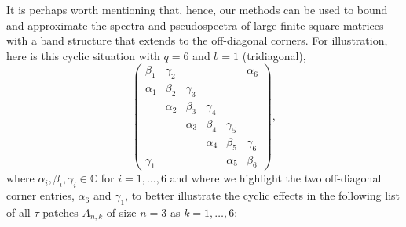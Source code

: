 \documentclass{article}
\newcommand\C{{\mathbb C}}
\numberwithin{equation}{section}   %
\numberwithin{figure}{section}  %
\begin{document}
It is perhaps worth mentioning that, hence, our methods can be used to bound and approximate the spectra and pseudospectra of large finite square matrices with a band structure that extends to the off-diagonal corners. 
%
For illustration, here is this cyclic situation with $q=6$ and $b=1$ (tridiagonal),
\begin{equation}
\left(\begin{array}{cccccc}
\beta_1&\gamma_2& &  & &{\alpha_6}\\
\alpha_1&\beta_2&\gamma_3\\
&\alpha_2&\beta_3&\gamma_4\\
&&\alpha_3&\beta_4&\gamma_5\\
&&&\alpha_4&\beta_5&\gamma_6\\
{\gamma_1}&&&&\alpha_{5}&\beta_6
\end{array}
\!\right),
\end{equation}
where $\alpha_i, \beta_i,\gamma_i\in\C$ for $i=1,\dots,6$ and where we highlight the two off-diagonal corner entries, \colorbox{black!7}{$\alpha_6$} and \colorbox{black!15}{$\gamma_1$}, to better illustrate the cyclic effects in the following list of all $\tau$ patches $A_{n,k}$ of size $n=3$ as $k=1,\dots,6$:
\end{document}
